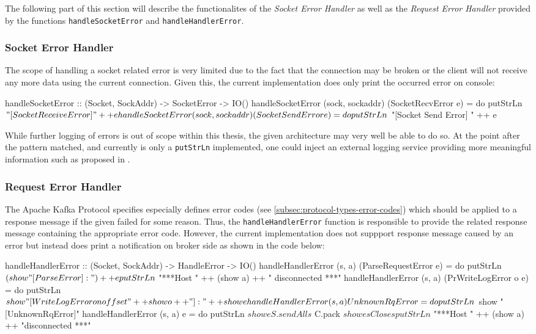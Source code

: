 The following part of this section will describe the functionalites of the
\textit{Socket Error Handler} as well as the \textit{Request Error Handler}
provided by the functions \lstinline{handleSocketError} and
\lstinline{handleHandlerError}.

\subsubsection{Socket Error Handler}

The scope of handling a socket related error is very limited due to the fact
that the connection may be broken or the client will not receive any more data
using the current connection. Given this, the current implementation does only
print the occurred error on console:

\begin{code}
handleSocketError :: (Socket, SockAddr) -> SocketError -> IO()
handleSocketError (sock, sockaddr) (SocketRecvError e) = do
  putStrLn $ "[Socket Receive Error] " ++ e
handleSocketError (sock, sockaddr) (SocketSendError e) = do
  putStrLn $ "[Socket Send Error] " ++ e
\end{code}

While further logging of errors is out of scope within this thesis, the given
architecture may very well be able to do so. At the point after the pattern
matched, and currently is only a \lstinline{putStrLn} implemented, one
could inject an external logging service providing more meaningful information
such as proposed in .

\subsubsection{Request Error Handler}

The Apache Kafka Protocol specifies especially
defines error codes (see \ref{subsec:protocol-types-error-codes}) which should
be applied to a response message if the given failed for some reason. Thus, the
\lstinline{handleHandlerError} function is responsible to provide the related
response message containing the appropriate error code. However, the current
implementation does not suppport response message caused by an error but instead
does print a notification on broker side as shown in the code below:

\begin{code}
handleHandlerError :: (Socket, SockAddr) -> HandleError -> IO()
handleHandlerError (s, a) (ParseRequestError e) = do
    putStrLn $ (show "[ParseError]: ") ++ e
    putStrLn $ "***Host " ++ (show a) ++ " disconnected ***"
handleHandlerError (s, a) (PrWriteLogError o e) = do
    putStrLn $ show "[WriteLogError on offset " ++ show o ++ "]: " ++ show e
handleHandlerError (s, a) UnknownRqError = do
    putStrLn $ show "[UnknownRqError]"
handleHandlerError (s, a) e = do
    putStrLn $ show e
    S.sendAll s $ C.pack $ show e
    sClose s
    putStrLn $ "***Host " ++ (show a) ++ "disconnected ***"
\end{code}


